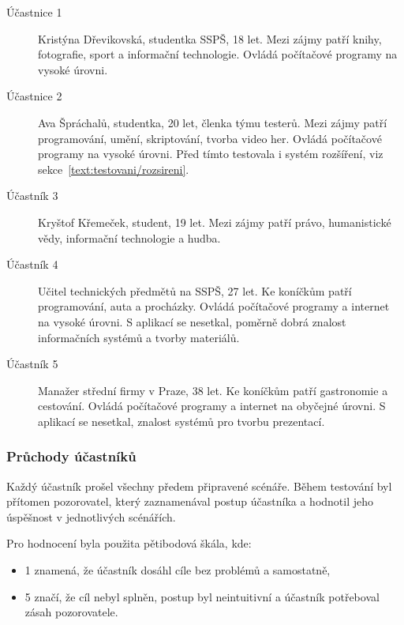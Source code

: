 \begin{description}
\item[Účastnice 1] Kristýna Dřevikovská, studentka SSPŠ, 18 let. Mezi zájmy patří knihy, fotografie, sport a informační technologie. Ovládá počítačové programy na vysoké úrovni.
\item[Účastnice 2] Ava Špráchalů, studentka, 20 let, členka týmu testerů. Mezi zájmy patří programování, umění, skriptování, tvorba video her. Ovládá počítačové programy na vysoké úrovni. Před tímto testovala i systém rozšíření, viz sekce~\ref{text:testovani/rozsireni}.
\item[Účastník 3] Kryštof Křemeček, student, 19 let. Mezi zájmy patří právo, humanistické vědy, informační technologie a hudba.
\item[Účastník 4] Učitel technických předmětů na SSPŠ, 27 let. Ke koníčkům patří programování, auta a procházky. Ovládá počítačové programy a internet na vysoké úrovni. S aplikací se nesetkal, poměrně dobrá znalost informačních systémů a tvorby materiálů.
\item[Účastník 5] Manažer střední firmy v Praze, 38 let. Ke koníčkům patří gastronomie a cestování. Ovládá počítačové programy a internet na obyčejné úrovni. S aplikací se nesetkal, znalost systémů pro tvorbu prezentací.
\end{description}

\subsubsection{Průchody účastníků}

Každý účastník prošel všechny předem připravené scénáře.
Během testování byl přítomen pozorovatel, který zaznamenával postup účastníka a hodnotil jeho úspěšnost v jednotlivých scénářích. 

Pro hodnocení byla použita pětibodová škála, kde:

\begin{itemize}
      \item 1 znamená, že účastník dosáhl cíle bez problémů a samostatně,
      \item 5 značí, že cíl nebyl splněn, postup byl neintuitivní a účastník potřeboval zásah pozorovatele.
\end{itemize}

